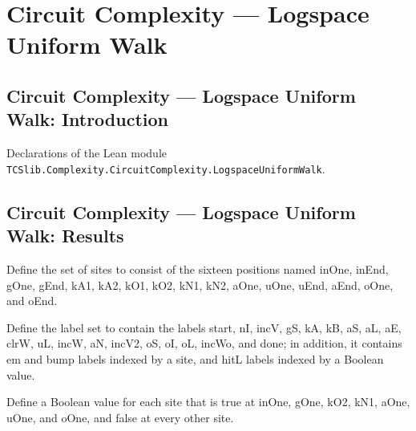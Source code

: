 \section{Circuit Complexity --- Logspace Uniform Walk}
\subsection*{Circuit Complexity --- Logspace Uniform Walk: Introduction}

Declarations of the Lean module \texttt{TCSlib.Complexity.CircuitComplexity.LogspaceUniformWalk}.

\subsection*{Circuit Complexity --- Logspace Uniform Walk: Results}

\begin{definition}
\label{BoolCircuit.AdjWalk.Site}
\leanok
Define the set of sites to consist of the sixteen positions named inOne, inEnd, gOne,
gEnd, kA1, kA2, kO1, kO2, kN1, kN2, aOne, uOne, uEnd, aEnd, oOne, and oEnd.
\end{definition}

\begin{definition}
\label{BoolCircuit.AdjWalk.Lbl}
\leanok
{}
Define the label set to contain the labels start, nI, incV, gS, kA, kB, aS, aL, aE,
clrW, uL, incW, aN, incV2, oS, oI, oL, incWo, and done; in addition, it contains em and
bump labels indexed by a site, and hitL labels indexed by a Boolean value.
\end{definition}

\begin{definition}
\label{BoolCircuit.AdjWalk.Site.bit}
\leanok
{}
Define a Boolean value for each site that is true at inOne, gOne, kO2, kN1, aOne, uOne,
and oOne, and false at every other site.
\end{definition}

